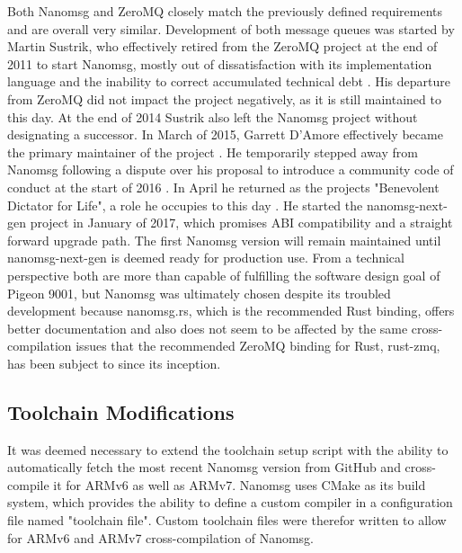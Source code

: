
Both Nanomsg and ZeroMQ closely match the previously defined requirements and are overall very similar. Development of both message queues was started by Martin Sustrik, who effectively retired from the ZeroMQ project at the end of 2011 to start Nanomsg, mostly out of dissatisfaction with its implementation language \cite{sustrik-cpp} and the inability to correct accumulated technical debt \cite{sustrik-zeromq}. His departure from ZeroMQ did not impact the project negatively, as it is still maintained to this day. At the end of 2014 Sustrik also left the Nanomsg project without designating a successor. In March of 2015, Garrett D'Amore effectively became the primary maintainer of the project \cite{damore-leader}. He temporarily stepped away from Nanomsg following a dispute over his proposal to introduce a community code of conduct at the start of 2016 \cite{damore-step-down}. In April he returned as the projects "Benevolent Dictator for Life", a role he occupies to this day \cite{damore-bdfl}. He started the nanomsg-next-gen project in January of 2017, which promises ABI compatibility \cite{nng-abi} and a straight forward upgrade path. The first Nanomsg version will remain maintained until nanomsg-next-gen is deemed ready for production use.
From a technical perspective both are more than capable of fulfilling the software design goal of Pigeon 9001, but Nanomsg was ultimately chosen despite its troubled development because nanomsg.rs, which is the recommended Rust binding, offers better documentation and also does not seem to be affected by the same cross-compilation issues \cite{zmq-cross} that the recommended ZeroMQ binding for Rust, rust-zmq, has been subject to since its inception.

\subsection{Toolchain Modifications}
It was deemed necessary to extend the toolchain setup script with the ability to automatically fetch the most recent Nanomsg version from GitHub and cross-compile it for ARMv6 as well as ARMv7. Nanomsg uses CMake as its build system, which provides the ability to define a custom compiler in a configuration file named "toolchain file". Custom toolchain files were therefor written to allow for ARMv6 and ARMv7 cross-compilation of Nanomsg.

